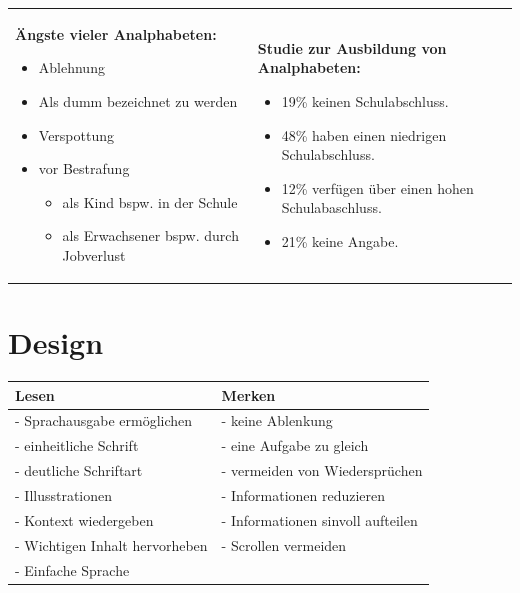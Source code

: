 \documentclass{handout}
\begin{document}
\begin{tabular}{ll}
 \parbox{7cm}{
		\textbf{Ängste vieler Analphabeten:}\\   
 	\begin{itemize}
		\item Ablehnung
		\item Als dumm bezeichnet zu werden
		\item Verspottung
		\item vor Bestrafung
			\begin{itemize}
				\item als Kind bspw. in der Schule
				\item als Erwachsener bspw. durch Jobverlust
			\end{itemize}
			
	\end{itemize}} &
 \parbox{7cm}{
	\textbf{Studie zur Ausbildung von Analphabeten:}\\
	\begin{itemize}
		\item 19\% keinen Schulabschluss. 
		\item 48\% haben einen niedrigen Schulabschluss. 
		\item 12\% verfügen über einen hohen Schulabaschluss. 
		\item 21\% keine Angabe.
	\end{itemize}
}
\end{tabular}
\section{Design}
\begin{tabular}{| l | l | }
\hline
Lesen & Merken \\
\hline
\hline
- Sprachausgabe ermöglichen     &  - keine Ablenkung\\
- einheitliche Schrift                     & - eine Aufgabe zu gleich\\
- deutliche Schriftart                   & - vermeiden von Wiedersprüchen\\
- Illusstrationen                           & - Informationen reduzieren\\
- Kontext wiedergeben               & - Informationen sinvoll aufteilen\\
- Wichtigen Inhalt hervorheben & - Scrollen vermeiden\\
- Einfache Sprache                     &                                                    \\
\hline
\end{tabular}
\end{document}
